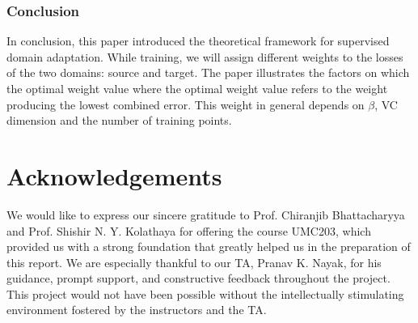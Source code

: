 \documentclass{article}
\begin{document}
\subsubsection{Conclusion}
In conclusion, this paper introduced the theoretical framework for supervised domain adaptation. While training, we will assign different weights to the losses of the two domains: source and target. The paper illustrates the factors on which the optimal weight value where the optimal weight value refers to the weight producing the lowest combined error. This weight in general depends on $\beta$, VC dimension and the number of training points.

\section*{Acknowledgements}
We would like to express our sincere gratitude to Prof. Chiranjib Bhattacharyya and Prof. Shishir N. Y. Kolathaya for offering the course UMC203, which provided us with a strong foundation that greatly helped us in the preparation of this report. We are especially thankful to our TA, Pranav K. Nayak, for his guidance, prompt support, and constructive feedback throughout the project. This project would not have been possible without the intellectually stimulating environment fostered by the instructors and the TA.
\end{document}
